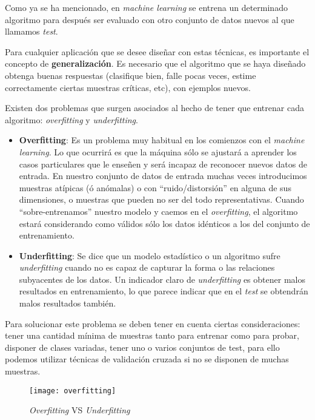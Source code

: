 Como ya se ha mencionado, en \textit{machine learning} se entrena un determinado algoritmo para después ser evaluado con otro conjunto de datos nuevos al que llamamos \textit{test}.\par 

Para cualquier aplicación que se desee diseñar con estas técnicas, es importante el concepto de \textbf{generalización}. Es necesario que el algoritmo que se haya diseñado obtenga buenas respuestas (clasifique bien, falle pocas veces, estime correctamente ciertas muestras críticas, etc), con ejemplos nuevos.\par 

Existen dos problemas que surgen asociados al hecho de tener que entrenar cada algoritmo: \textit{overfitting} y \textit{underfitting}.
\begin{itemize}
	\item \textbf{Overfitting}: Es un problema muy habitual en los comienzos con el \textit{machine learning}. Lo que ocurrirá es que la máquina sólo se ajustará a aprender los casos particulares que le enseñen y será incapaz de reconocer nuevos datos de entrada. En nuestro conjunto de datos de entrada muchas veces introducimos muestras atípicas (ó anómalas) o con “ruido/distorsión” en alguna de sus dimensiones, o muestras que pueden no ser del todo representativas. Cuando “sobre-entrenamos” nuestro modelo y caemos en el \textit{overfitting}, el algoritmo estará considerando como válidos sólo los datos idénticos a los del conjunto de entrenamiento.\cite{overfitting}
	\item \textbf{Underfitting}: Se dice que un modelo estadístico o un algoritmo sufre \textit{underfitting} cuando no es capaz de capturar la forma o las relaciones subyacentes de los datos.\cite{underfitting} Un indicador claro de \textit{underfitting} es obtener malos resultados en entrenamiento, lo que parece indicar que en el \textit{test} se obtendrán malos resultados también.
\end{itemize}

Para solucionar este problema se deben tener en cuenta ciertas consideraciones:\cite{overfitting} tener una cantidad mínima de muestras tanto para entrenar como para probar, disponer de clases variadas, tener uno o varios conjuntos de test, para ello podemos utilizar técnicas de validación cruzada si no se disponen de muchas muestras.

\begin{figure}[h]
	\centering
	\texttt{[image: overfitting]}
	\caption{\textit{Overfitting} VS \textit{Underfitting}}
	\label{fig:Overfitting}
\end{figure}

